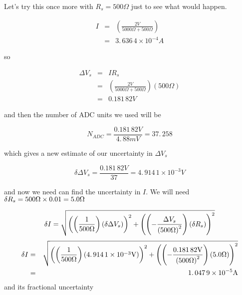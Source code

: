Let's try this once more with $R_{s}=500\unit{\Omega}$ just to see what would happen.

\begin{eqnarray*}
I &=&\left( \frac{2\unit{V}}{5000\unit{\Omega}+500\unit{\Omega}}\right) \\
  &=&3.\,\allowbreak 636\,4\times 10^{-4}\unit{A}
\end{eqnarray*}

so

\begin{eqnarray*}
	\Delta V_{s} &=&IR_{s} \\
                 &=&\left( \frac{2\unit{V}}{5000\unit{\Omega}+500\unit{\Omega}}\right) \left( 500\unit{\Omega}\right) \\
                 &=&0.181\,82\unit{V}
\end{eqnarray*}

and then the number of ADC units we used will be 

\begin{equation*}
     N_{ADC}=\frac{0.181\,82\unit{V}}{4.\,\allowbreak 88\unit{mV}}=37.\,\allowbreak 258
\end{equation*}

which gives a new estimate of our uncertainty in $\Delta V_{s}$ 

\begin{equation*}
    \delta \Delta V_{s}=\frac{0.181\,82\unit{V}}{37}=4.\,\allowbreak914\,1\times 10^{-3}\unit{V}
\end{equation*}

and now we need can find the uncertainty in $I.$ We will need $\delta
R_{s}=500\unit{%
\Omega%
}\times 0.01=\allowbreak 5.0\unit{%
\Omega%
}$

\begin{equation*}
\delta I=\sqrt{\left( \left( \frac{1}{500\unit{%
\Omega%
}}\right) \left( \delta \Delta V_{s}\right) \right) ^{2}+\left( \left( -%
\frac{\Delta V_{s}}{\left( 500\unit{%
\Omega%
}\right) ^{2}}\right) \left( \delta R_{s}\right) \right) ^{2}}
\end{equation*}%
\begin{eqnarray*}
\delta I &=&\sqrt{\left( \left( \frac{1}{500\unit{%
\Omega%
}}\right) \left( 4.\,\allowbreak 914\,1\times 10^{-3}\unit{V}\right) \right)
^{2}+\left( \left( -\frac{0.181\,82\unit{V}}{\left( 500\unit{%
\Omega%
}\right) ^{2}}\right) \left( 5.0\unit{%
\Omega%
}\right) \right) ^{2}} \\
&=&1.\,\allowbreak 047\,9\times 10^{-5}\unit{A}
\end{eqnarray*}
and its fractional uncertainty


